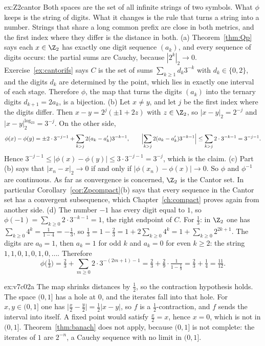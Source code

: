 \begin{solution}{ex:Z2cantor}
\idea Both spaces are the set of all infinite strings of two symbols. What $\phi$ keeps is the string of digits. What it changes is the rule that turns a string into a number. Strings that share a long common prefix are close in both metrics, and the first index where they differ is the distance in both.
\writeup (a) Theorem~\ref{thm:Qp} says each $x\in\Z_2$ has exactly one digit sequence $(a_k)$, and every sequence of digits occurs: the partial sums are Cauchy, because $|2^k|_2\to0$. Exercise~\ref{ex:cantorifs} says $C$ is the set of sums $\sum_{k\ge1}d_k3^{-k}$ with $d_k\in\{0,2\}$, and the digits $d_k$ are determined by the point, which lies in exactly one interval of each stage. Therefore $\phi$, the map that turns the digits $(a_k)$ into the ternary digits $d_{k+1}=2a_k$, is a bijection. (b) Let $x\ne y$, and let $j$ be the first index where the digits differ. Then $x-y=2^j(\pm1+2z)$ with $z\in\Z_2$, so $|x-y|_2=2^{-j}$ and $|x-y|_2^{\log_23}=3^{-j}$. On the other side,
\[\phi(x)-\phi(y)=\pm2\cdot3^{-j-1}+\sum_{k>j}2(a_k-a_k')3^{-k-1},\qquad\Bigl|\sum_{k>j}2(a_k-a_k')3^{-k-1}\Bigr|\le\sum_{k>j}2\cdot3^{-k-1}=3^{-j-1}.\]
Hence $3^{-j-1}\le|\phi(x)-\phi(y)|\le3\cdot3^{-j-1}=3^{-j}$, which is the claim. (c) Part (b) says that $|x_n-x|_2\to0$ if and only if $|\phi(x_n)-\phi(x)|\to0$. So $\phi$ and $\phi^{-1}$ are continuous. As far as convergence is concerned, $\Z_2$ is the Cantor set. In particular Corollary~\ref{cor:Zpcompact}(b) says that every sequence in the Cantor set has a convergent subsequence, which Chapter~\ref{ch:compact} proves again from another side. (d) The number $-1$ has every digit equal to $1$, so $\phi(-1)=\sum_{k\ge0}2\cdot3^{-k-1}=1$, the right endpoint of $C$. For $\frac13$: in $\Z_2$ one has $\sum_{k\ge0}4^k=\frac1{1-4}=-\frac13$, so $\frac13=1-\frac23=1+2\sum_{k\ge0}4^k=1+\sum_{k\ge0}2^{2k+1}$. The digits are $a_0=1$, then $a_k=1$ for odd $k$ and $a_k=0$ for even $k\ge2$: the string $1,1,0,1,0,1,0,\ldots$. Therefore
\[\phi\bigl(\tfrac13\bigr)=\tfrac23+\sum_{m\ge0}2\cdot3^{-(2m+1)-1}=\tfrac23+\tfrac29\cdot\tfrac1{1-\frac19}=\tfrac23+\tfrac14=\tfrac{11}{12}.\]
\end{solution}

\begin{solution}{ex:v7c02a}
\idea The map shrinks distances by $\frac12$, so the contraction hypothesis holds. The space $(0,1]$ has a hole at $0$, and the iterates fall into that hole.
\writeup For $x,y\in(0,1]$ one has $\bigl|\frac x2-\frac y2\bigr|=\frac12|x-y|$, so $f$ is a $\frac12$-contraction, and $f$ sends the interval into itself. A fixed point would satisfy $\frac x2=x$, hence $x=0$, which is not in $(0,1]$. Theorem~\ref{thm:banach} does not apply, because $(0,1]$ is not complete: the iterates of $1$ are $2^{-n}$, a Cauchy sequence with no limit in $(0,1]$.
\end{solution}

